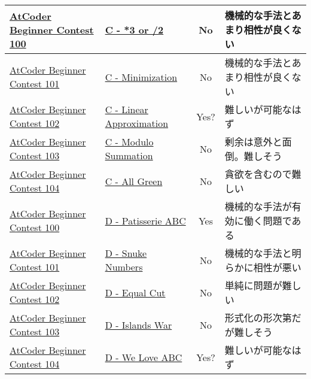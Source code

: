 \documentclass{ltjsarticle}
\begin{document}
\begin{table}[p]
\begin{center}
{\begin{tabular}{|l|l|c|l|}
                \href{https://atcoder.jp/contests/abc100}{AtCoder Beginner Contest 100} & \href{https://atcoder.jp/contests/abc100/tasks/abc100_c}{C - *3 or /2} & No & 機械的な手法とあまり相性が良くない \\ \hline
                \href{https://atcoder.jp/contests/abc101}{AtCoder Beginner Contest 101} & \href{https://atcoder.jp/contests/abc101/tasks/arc099_a}{C - Minimization} & No & 機械的な手法とあまり相性が良くない \\ \hline
                \href{https://atcoder.jp/contests/abc102}{AtCoder Beginner Contest 102} & \href{https://atcoder.jp/contests/abc102/tasks/arc100_a}{C - Linear Approximation} & Yes? & 難しいが可能なはず \\ \hline
                \href{https://atcoder.jp/contests/abc103}{AtCoder Beginner Contest 103} & \href{https://atcoder.jp/contests/abc103/tasks/abc103_c}{C - Modulo Summation} & No & 剰余は意外と面倒。難しそう \\ \hline
                \href{https://atcoder.jp/contests/abc104}{AtCoder Beginner Contest 104} & \href{https://atcoder.jp/contests/abc104/tasks/abc104_c}{C - All Green} & No & 貪欲を含むので難しい \\ \hline \hline

                \href{https://atcoder.jp/contests/abc100}{AtCoder Beginner Contest 100} & \href{https://atcoder.jp/contests/abc100/tasks/abc100_d}{D - Patisserie ABC} & Yes & 機械的な手法が有効に働く問題である \\ \hline
                \href{https://atcoder.jp/contests/abc101}{AtCoder Beginner Contest 101} & \href{https://atcoder.jp/contests/abc101/tasks/arc099_b}{D - Snuke Numbers} & No & 機械的な手法と明らかに相性が悪い \\ \hline
                \href{https://atcoder.jp/contests/abc102}{AtCoder Beginner Contest 102} & \href{https://atcoder.jp/contests/abc102/tasks/arc100_b}{D - Equal Cut} & No & 単純に問題が難しい \\ \hline
                \href{https://atcoder.jp/contests/abc103}{AtCoder Beginner Contest 103} & \href{https://atcoder.jp/contests/abc103/tasks/abc103_d}{D - Islands War} & No & 形式化の形次第だが難しそう \\ \hline
                \href{https://atcoder.jp/contests/abc104}{AtCoder Beginner Contest 104} & \href{https://atcoder.jp/contests/abc104/tasks/abc104_d}{D - We Love ABC} & Yes? & 難しいが可能なはず \\ \hline
            \end{tabular}
        }
    \end{center}
\end{table}
\end{document}
